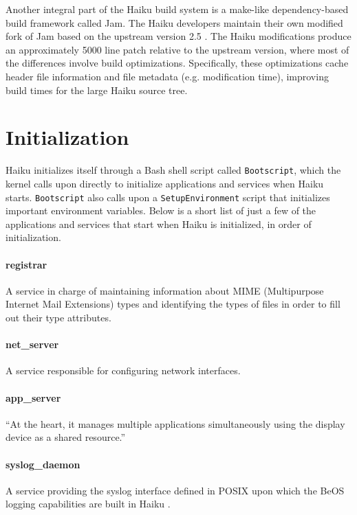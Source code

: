 \documentclass{article}
\begin{document}
Another integral part of the Haiku build system is a make-like
dependency-based build framework called Jam.  The Haiku developers
maintain their own modified fork of Jam based on the upstream version
2.5 \cite{UsingJam}.  The Haiku modifications produce an approximately
5000 line patch relative to the upstream version, where most of the
differences involve build optimizations.  Specifically, these
optimizations cache header file information and file metadata
(e.g. modification time), improving build times for the large Haiku
source tree.

\section{Initialization}

Haiku initializes itself through a Bash shell script
called \texttt{Bootscript}, which the kernel calls upon directly to
initialize applications and services when Haiku
starts. \texttt{Bootscript} also calls upon
a \texttt{SetupEnvironment} script that initializes important
environment variables. Below is a short list of just a few of the
applications and services that start when Haiku is initialized, in
order of initialization.

\paragraph{registrar}
A service in charge of maintaining information about MIME
(Multipurpose Internet Mail Extensions) types and identifying the
types of files in order to fill out their type
attributes. \cite{RegistrarInfo}

\paragraph{net\_server}
A service responsible for configuring network
interfaces. \cite{NetServerSource}

\paragraph{app\_server}
``At the heart, it manages multiple applications simultaneously using
the display device as a shared resource.''\cite{AppServer}

\paragraph{syslog\_daemon}
A service providing the syslog interface defined in POSIX upon which
the BeOS logging capabilities are built in Haiku \cite{SyslogInfo}.
\end{document}

